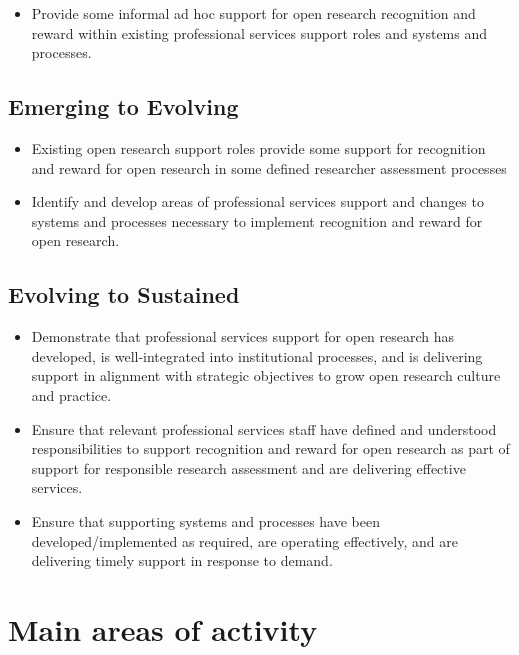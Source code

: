 \documentclass[
  letterpaper,
  DIV=11,
  numbers=noendperiod,
  oneside]{scrreprt}
\providecommand{\tightlist}{%
  \setlength{\itemsep}{0pt}\setlength{\parskip}{0pt}}\usepackage{longtable,booktabs,array}
\begin{document}
\begin{itemize}
\tightlist
\item
  Provide some informal ad hoc support for open research recognition and
  reward within existing professional services support roles and systems
  and processes.
\end{itemize}

\subsection{Emerging to Evolving}\label{emerging-to-evolving-5}

\begin{itemize}
\item
  Existing open research support roles provide some support for
  recognition and reward for open research in some defined researcher
  assessment processes
\item
  Identify and develop areas of professional services support and
  changes to systems and processes necessary to implement recognition
  and reward for open research.
\end{itemize}

\subsection{Evolving to Sustained}\label{evolving-to-sustained-5}

\begin{itemize}
\item
  Demonstrate that professional services support for open research has
  developed, is well-integrated into institutional processes, and is
  delivering support in alignment with strategic objectives to grow open
  research culture and practice.
\item
  Ensure that relevant professional services staff have defined and
  understood responsibilities to support recognition and reward for open
  research as part of support for responsible research assessment and
  are delivering effective services.
\item
  Ensure that supporting systems and processes have been
  developed/implemented as required, are operating effectively, and are
  delivering timely support in response to demand.
\end{itemize}

\section{Main areas of activity}\label{main-areas-of-activity-5}
\end{document}
